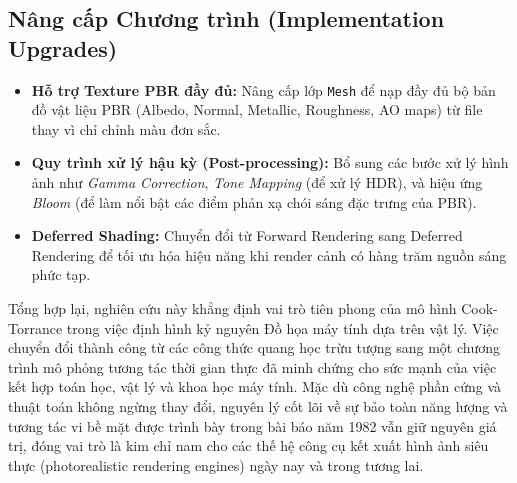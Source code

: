 \subsection{Nâng cấp Chương trình (Implementation Upgrades)}
\begin{itemize}
	\item \textbf{Hỗ trợ Texture PBR đầy đủ:} Nâng cấp lớp \texttt{Mesh} để nạp đầy đủ bộ bản đồ vật liệu PBR (Albedo, Normal, Metallic, Roughness, AO maps) từ file thay vì chỉ chỉnh màu đơn sắc.
	\item \textbf{Quy trình xử lý hậu kỳ (Post-processing):} Bổ sung các bước xử lý hình ảnh như \textit{Gamma Correction}, \textit{Tone Mapping} (để xử lý HDR), và hiệu ứng \textit{Bloom} (để làm nổi bật các điểm phản xạ chói sáng đặc trưng của PBR).
	\item \textbf{Deferred Shading:} Chuyển đổi từ Forward Rendering sang Deferred Rendering để tối ưu hóa hiệu năng khi render cảnh có hàng trăm nguồn sáng phức tạp.
\end{itemize}

Tổng hợp lại, nghiên cứu này khẳng định vai trò tiên phong của mô hình Cook-Torrance trong việc định hình kỷ nguyên Đồ họa máy tính dựa trên vật lý. Việc chuyển đổi thành công từ các công thức quang học trừu tượng sang một chương trình mô phỏng tương tác thời gian thực đã minh chứng cho sức mạnh của việc kết hợp toán học, vật lý và khoa học máy tính. Mặc dù công nghệ phần cứng và thuật toán không ngừng thay đổi, nguyên lý cốt lõi về sự bảo toàn năng lượng và tương tác vi bề mặt được trình bày trong bài báo năm 1982 vẫn giữ nguyên giá trị, đóng vai trò là kim chỉ nam cho các thế hệ công cụ kết xuất hình ảnh siêu thực (photorealistic rendering engines) ngày nay và trong tương lai.